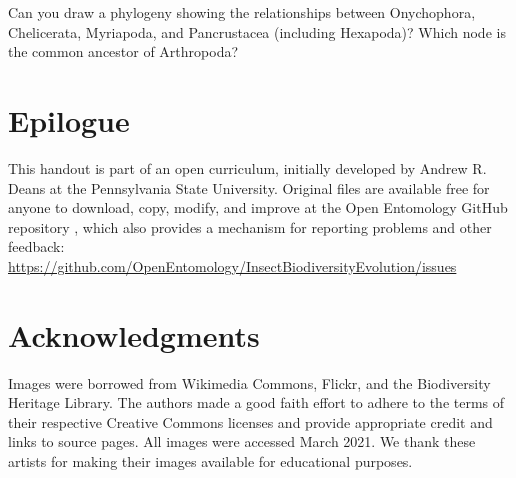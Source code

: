 \documentclass[letterpaper, 11pt]{article}
\begin{document}
\noindent{}Can you draw a phylogeny showing the relationships between Onychophora, Chelicerata, Myriapoda, and Pancrustacea (including Hexapoda)? Which node is the common ancestor of Arthropoda? \citep[Hint: see][]{Dunlop2013}\\

\clearpage

\section*{Epilogue}
This handout is part of an open curriculum, initially developed by Andrew R. Deans at the Pennsylvania State University. Original files are available free for anyone to download, copy, modify, and improve at the Open Entomology GitHub repository \citep{ENT532}, which also provides a mechanism for reporting problems and other feedback:\\
\url{https://github.com/OpenEntomology/InsectBiodiversityEvolution/issues}

\section*{Acknowledgments}
Images were borrowed from Wikimedia Commons, Flickr, and the Biodiversity Heritage Library. The authors made a good faith effort to adhere to the terms of their respective Creative Commons licenses and provide appropriate credit and links to source pages. All images were accessed March 2021. We thank these artists for making their images available for educational purposes.


\FloatBarrier


\end{document}
